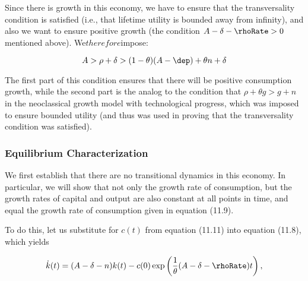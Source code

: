 \documentclass[\topdir/lecture\_notes.tex]{subfiles}
\begin{document}
Since there is growth in this economy, we have to ensure that the transversality condition is satisfied (i.e., that lifetime utility is bounded away from infinity), and also we want to ensure positive growth (the condition $A-\delta-\rhoRate > 0$ mentioned above). We$ therefore $impose:

\[
A>\rho+\delta>(1-\theta)(A-\dep)+\theta n+\delta
\]

The first part of this condition ensures that there will be positive consumption growth, while the second part is the analog to the condition that $\rho+\theta g>g+n$ in the neoclassical growth model with technological progress, which was imposed to ensure bounded utility (and thus was used in proving that the transversality condition was satisfied).

\subsubsection{Equilibrium Characterization}
We first establish that there are no transitional dynamics in this economy. In particular, we will show that not only the growth rate of consumption, but the growth rates of capital and output are also constant at all points in time, and equal the growth rate of consumption given in equation (11.9).

To do this, let us substitute for $c(t)$ from equation (11.11) into equation (11.8), which yields

\[
\dot{k}(t)=(A-\delta-n) k(t)-c(0) \exp \left(\frac{1}{\theta}(A-\delta-\rhoRate) t\right),
\]
\end{document}
